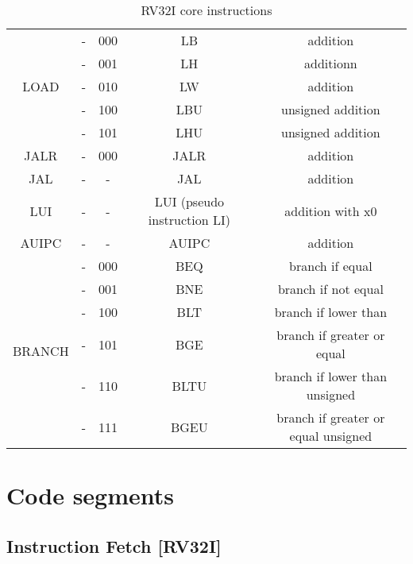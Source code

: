 \begin{table}[ht]
\begin{center}
\begin{tabular}{|c|c|c|c|c|}
            \hline
            \multirow{5}{*}{LOAD} & - & 000 & LB & addition\\
            & - & 001 & LH & additionn\\
            & - & 010 & LW & addition\\
            & - & 100 & LBU & unsigned addition\\
            & - & 101 & LHU & unsigned addition\\
            \hline
            JALR & - & 000 & JALR & addition\\
            \hline
            JAL & - & - & JAL & addition\\
            \hline
            LUI & - & - & LUI (pseudo instruction LI) & addition with x0\\
            \hline
            AUIPC & - & - & AUIPC & addition\\
            \hline
            \multirow{6}{*}{BRANCH} & - & 000 & BEQ & branch if equal\\
            & - & 001 & BNE & branch if not equal\\
            & - & 100 & BLT & branch if lower than\\
            & - & 101 & BGE & branch if greater or equal\\
            & - & 110 & BLTU & branch if lower than unsigned\\
            & - & 111 & BGEU & branch if greater or equal unsigned\\
            \hline
        \end{tabular}
        \caption{RV32I core instructions}
        \label{table:core_instr}
    \end{center}
\end{table}

\section{Code segments}
\subsection{Instruction Fetch [RV32I]}
